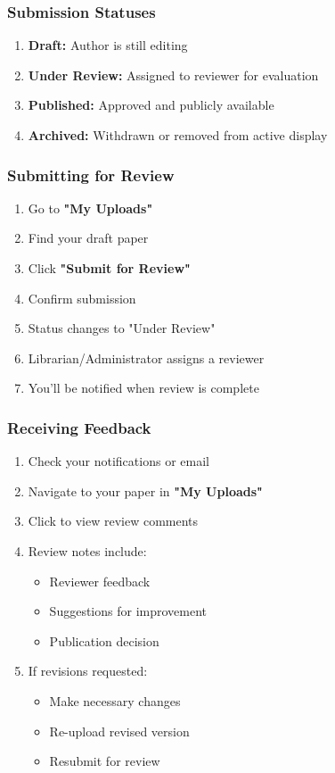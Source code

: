 \documentclass[12pt,a4paper]{article}
\begin{document}
\subsubsection{Submission Statuses}
\begin{enumerate}[leftmargin=*]
    \item \textbf{Draft:} Author is still editing
    \item \textbf{Under Review:} Assigned to reviewer for evaluation
    \item \textbf{Published:} Approved and publicly available
    \item \textbf{Archived:} Withdrawn or removed from active display
\end{enumerate}

\subsubsection{Submitting for Review}
\begin{enumerate}[leftmargin=*]
    \item Go to \textbf{"My Uploads"}
    \item Find your draft paper
    \item Click \textbf{"Submit for Review"}
    \item Confirm submission
    \item Status changes to "Under Review"
    \item Librarian/Administrator assigns a reviewer
    \item You'll be notified when review is complete
\end{enumerate}

\subsubsection{Receiving Feedback}
\begin{enumerate}[leftmargin=*]
    \item Check your notifications or email
    \item Navigate to your paper in \textbf{"My Uploads"}
    \item Click to view review comments
    \item Review notes include:
        \begin{itemize}
            \item Reviewer feedback
            \item Suggestions for improvement
            \item Publication decision
        \end{itemize}
    \item If revisions requested:
        \begin{itemize}
            \item Make necessary changes
            \item Re-upload revised version
            \item Resubmit for review
        \end{itemize}
\end{enumerate}
\end{document}
